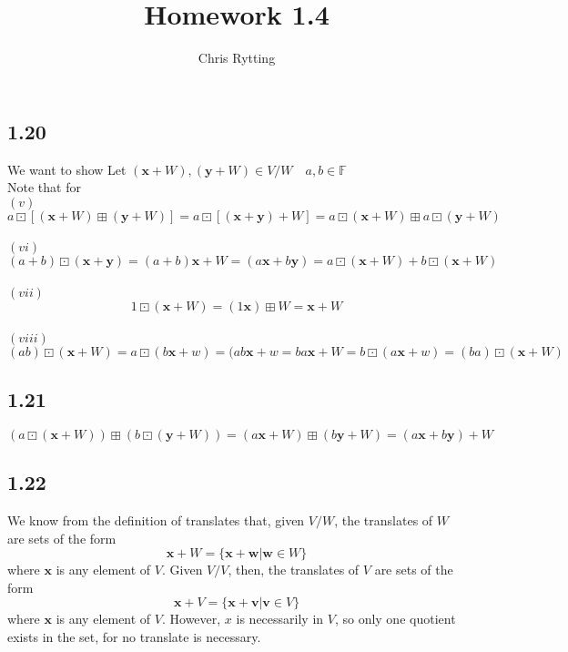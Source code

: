 \documentclass[letterpaper,12pt]{article}
\theoremstyle{definition}
\begin{document}
\title{Homework 1.4}
\author{Chris Rytting}
\maketitle

\subsection*{1.20}
We want to show
Let $(\mathbf{x} + W), (\mathbf{y} + W) \in V/W \quad a,b \in \mathbb{F}$\\
Note that for
\\
$(v)$
\[a \boxdot [(\mathbf{x} + W) \boxplus (\mathbf{y}  + W)] = a \boxdot [(\mathbf{x} +\mathbf{y})  + W] = a \boxdot (\mathbf{x} + W) \boxplus a \boxdot (\mathbf{y} + W)\]
\\
$(vi)$\\
\[(a+b) \boxdot (\mathbf{x}  + \mathbf{y} ) = ( a + b)\mathbf{x} + W = (a \mathbf{x} + b \mathbf{y} ) = a\boxdot (\mathbf{x}  + W) + b\boxdot (\mathbf{x}  + W)\]
\\
$(vii)$\\
\[1 \boxdot (\mathbf{x}  + W ) = (1\mathbf{x} ) \boxplus W = \mathbf{x}  + W\]
\\
$(viii)$
\[(ab) \boxdot (\mathbf{x} + W) = a \boxdot(b \mathbf{x}  + w) = (ab \mathbf{x} + w = ba \mathbf{x}  + W = b \boxdot (a \mathbf{x}  + w) = (ba) \boxdot (\mathbf{x}+W) \]

\subsection*{1.21}
\[(a \boxdot(\mathbf{x}  + W)) \boxplus (b \boxdot( \mathbf{y} +  W)) = (a \mathbf{x}  +W ) \boxplus ( b \mathbf{y}  + W) = (a \mathbf{x}  + b \mathbf{y}) + W\]

\subsection*{1.22}
We know from the definition of translates that, given $V/W$, the translates of $W$ are sets of the form \[\mathbf{x} + W = \{ \mathbf{x}  + \mathbf{w}  \vert \mathbf{w} \in W\}\] where $\mathbf{x}$ is any element of $V$. Given $V/V$, then, the translates of $V$ are sets of the form
\[\mathbf{x} + V = \{ \mathbf{x}  + \mathbf{v}  \vert \mathbf{v} \in V\}\] where $\mathbf{x}$ is any element of $V$. However, $x$ is necessarily in $V$, so only one quotient exists in the set, for no translate is necessary.
\end{document}
